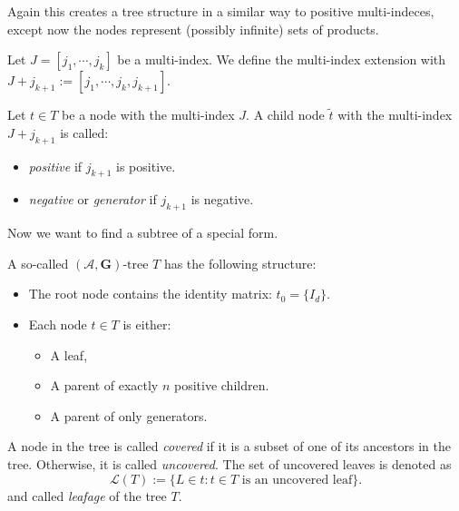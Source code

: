 Again this creates a tree structure in a similar way to positive multi-indeces, except now the nodes represent (possibly infinite) sets of products. 

\begin{definition}
    Let $J = [j_1, \cdots, j_k]$ be a multi-index. We define the multi-index extension with $J + j_{k+1} := [j_1, \cdots, j_k, j_{k+1}].$
\end{definition}

\begin{definition}
    Let $t \in T$ be a node with the multi-index $J$.
    A child node $\tilde{t}$ with the multi-index $J+j_{k+1}$ is called:
    \begin{itemize}
        \item \emph{positive} if $j_{k+1}$ is positive.
        \item \emph{negative} or \emph{generator} if $j_{k+1}$ is negative.
    \end{itemize}
\end{definition}

Now we want to find a subtree of a special form. 

\begin{definition}
    \label{def:tree}
    \begin{samepage}
    A so-called $(\mathcal{A},\mathbf{G})\text{-tree } T$ has the following structure: 
\begin{itemize}
    \item The root node contains the identity matrix: \( t_0 = \{I_d\} \).
    
    \item Each node \( t \in T \) is either:
    \begin{itemize}
        \item A leaf,
        \item A parent of exactly \( n \) positive children.
        \item A parent of only generators.
    \end{itemize}
\end{itemize}
\end{samepage}
\end{definition}


\begin{definition}
    A node in the tree is called \emph{covered} if it is a subset of one of its ancestors in the tree. Otherwise, it is called \emph{uncovered}. 
    The set of uncovered leaves is denoted as
\[
    \mathcal{L}(T) := \{ L \in t : t \in T \text{ is an uncovered leaf} \}.
\]
and called \emph{leafage} of the tree $T$.
\end{definition}

